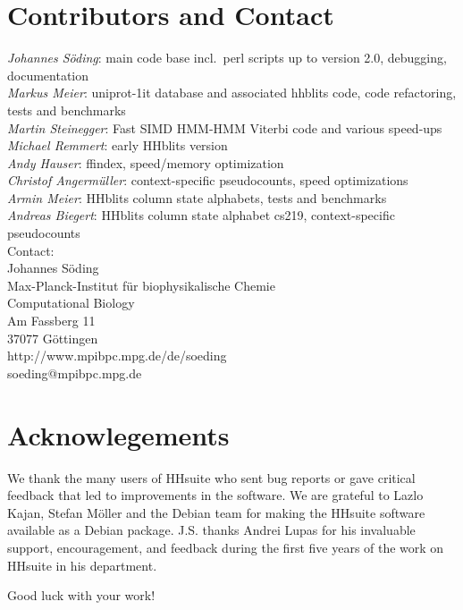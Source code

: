 \documentclass[11pt,a4paper]{article}
\begin{document}
\section{Contributors and Contact}

\emph{Johannes S\"oding}: main code base incl.\ perl scripts up to version 2.0, debugging, documentation\\ [1mm]
\emph{Markus Meier}: uniprot-1it database and associated hhblits code, code refactoring, tests and benchmarks\\[1mm]
\emph{Martin Steinegger}: Fast SIMD HMM-HMM Viterbi code and various speed-ups\\[1mm]
\emph{Michael Remmert}: early HHblits version\\[1mm]
\emph{Andy Hauser}: ffindex, speed/memory optimization\\[1mm]
\emph{Christof Angerm\"uller}: context-specific pseudocounts, speed optimizations\\[1mm]
\emph{Armin Meier}: HHblits column state alphabets, tests and benchmarks\\[1mm]
\emph{Andreas Biegert}: HHblits column state alphabet cs219, context-specific pseudocounts\\[1mm]

Contact:\\[2mm]
Johannes S\"oding\\
Max-Planck-Institut für biophysikalische Chemie\\
Computational Biology\\
Am Fassberg 11\\
37077 G\"ottingen\\
http://www.mpibpc.mpg.de/de/soeding\\
soeding@mpibpc.mpg.de
\section{Acknowlegements}

We thank the many users of HHsuite who sent bug reports or gave critical feedback that led to improvements in the software. 
We are grateful to Lazlo Kajan, Stefan M\"oller and the Debian team for making the HHsuite software available as a Debian package. J.S. thanks Andrei Lupas for his invaluable support, encouragement, and feedback during the first five years of the work on HHsuite in his department.

%


 


\vspace{20mm}
\begin{center}
Good luck with your work!

\end{center}
\end{document}
